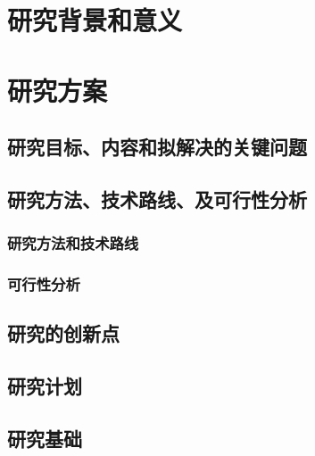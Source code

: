 {
    \chapter{研究背景和意义}
    

    
    
    \chapter{研究方案}
    \section{研究目标、内容和拟解决的关键问题}
    
    \section{研究方法、技术路线、及可行性分析}
    \subsection{研究方法和技术路线}
    
    \subsection{可行性分析}
    
    \section{研究的创新点}
    
    \section{研究计划}
    

    \section{研究基础}
    
}
{
    
    
    
    
    
    
    
}




